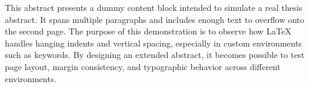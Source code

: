 This abstract presents a dummy content block intended to simulate a real thesis abstract. It spans multiple paragraphs and includes enough text to overflow onto the second page. The purpose of this demonstration is to observe how {\LaTeX} handles hanging indents and vertical spacing, especially in custom environments such as keywords. By designing an extended abstract, it becomes possible to test page layout, margin consistency, and typographic behavior across different environments.





